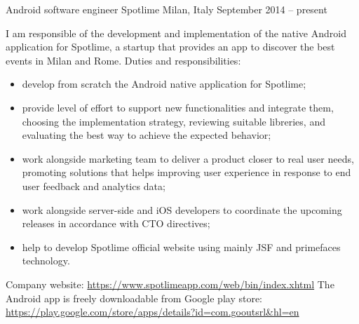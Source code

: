 \begin{cventries}
\cventry
{Android software engineer}
{Spotlime}
{Milan, Italy}
{September 2014 -- present}
{
   I am responsible of the 
   development and implementation of the 
   native Android application for 
   Spotlime, a startup that
   provides an app to discover the best events in Milan and Rome. 
   Duties and responsibilities:
   \begin{itemize}
      \item develop from scratch the Android native application
	 for Spotlime;
      \item provide level of effort to support new functionalities and
	 integrate them, 
      choosing the implementation strategy, reviewing suitable libreries,
      and evaluating the best way to
	 achieve the expected behavior;
      \item 
   work alongside marketing team to deliver a product closer
   to real user
   needs, promoting solutions that helps improving user experience in response
   to end user feedback and analytics data;
      \item 
   work alongside server-side and iOS developers to coordinate the upcoming
   releases in accordance with CTO directives;
\item help to develop Spotlime official website using mainly JSF and
   primefaces technology.
\end{itemize}
   Company website:
   \url{https://www.spotlimeapp.com/web/bin/index.xhtml}
   The Android app is freely downloadable from Google play store: 
   \url{https://play.google.com/store/apps/details?id=com.gooutsrl&hl=en}
}


\end{cventries}
